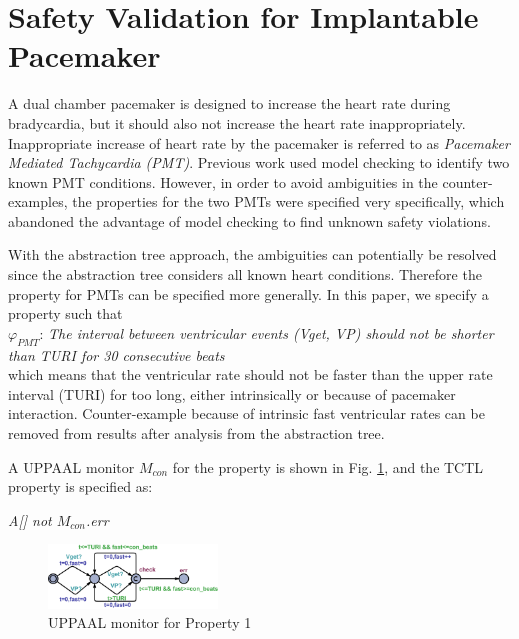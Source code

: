 \section{Safety Validation for Implantable Pacemaker}
A dual chamber pacemaker is designed to increase the heart rate during bradycardia, but it should also not increase the heart rate inappropriately.
Inappropriate increase of heart rate by the pacemaker is referred to as \emph{Pacemaker Mediated Tachycardia (PMT)}.
Previous work \cite{STTT13} used model checking to identify two known PMT conditions.
However, in order to avoid ambiguities in the counter-examples, the properties for the two PMTs were specified very specifically, which abandoned the advantage of model checking to find unknown safety violations.

With the abstraction tree approach, the ambiguities can potentially be resolved since the abstraction tree considers all known heart conditions.
Therefore the property for PMTs can be specified more generally.
In this paper, we specify a property such that\\
$\varphi_{PMT}$: \emph{The interval between ventricular events (Vget, VP) should not be shorter than TURI for 30 consecutive beats}\\
which means that the ventricular rate should not be faster than the upper rate interval (TURI) for too long, either intrinsically or because of pacemaker interaction.
Counter-example because of intrinsic fast ventricular rates can be removed from results after analysis from the abstraction tree.

A UPPAAL monitor $M_{con}$ for the property is shown in Fig. \ref{fig:monitor}, and the TCTL property is specified as:\\
\begin{center}
\emph{A[] not $M_{con}$.err}
\end{center}

\begin{figure}[!t]
	\centering
	\includegraphics[width=0.4\textwidth]{figs/monitor.png}
	\caption{\small UPPAAL monitor for Property 1}
	\label{fig:monitor}
\end{figure}


